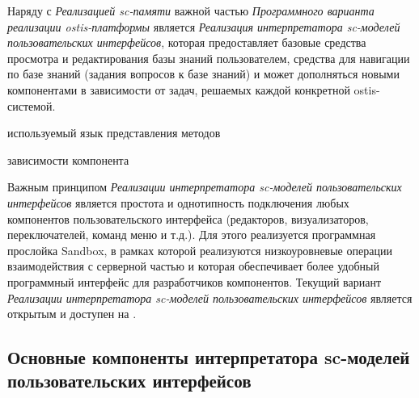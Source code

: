 Наряду с \textit{Реализацией sc-памяти} важной частью \textit{Программного варианта реализации ostis-платформы} является \textit{Реализация интерпретатора sc-моделей пользовательских интерфейсов}, которая предоставляет базовые средства просмотра и редактирования базы знаний пользователем, средства для навигации по базе знаний (задания вопросов к базе знаний) и может дополняться новыми компонентами в зависимости от задач, решаемых каждой конкретной ostis-системой.

\begin{SCn}
	\begin{scnrelfromlist}{используемый язык представления методов}
	\end{scnrelfromlist}
	\begin{scnrelfromset}{зависимости компонента}
	\end{scnrelfromset}
\end{SCn}

Важным принципом \textit{Реализации интерпретатора sc-моделей пользовательских интерфейсов} является простота и однотипность подключения любых компонентов пользовательского интерфейса (редакторов, визуализаторов, переключателей, команд меню и т.д.). Для этого реализуется программная прослойка Sandbox, в рамках которой реализуются низкоуровневые операции взаимодействия с серверной частью и которая обеспечивает более удобный программный интерфейс для разработчиков компонентов. Текущий вариант \textit{Реализации интерпретатора sc-моделей пользовательских интерфейсов} является открытым и доступен на \cite{sc-web}.

\subsection{Основные компоненты интерпретатора sc-моделей пользовательских интерфейсов}
\label{sec_soft_platform_sci_machine_components}

